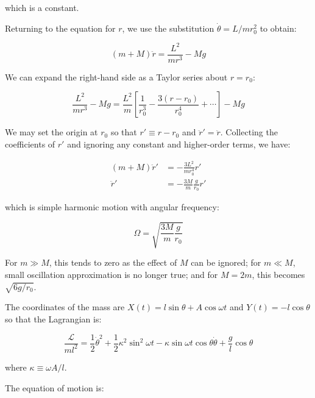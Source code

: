 \documentclass[12pt]{article}
\begin{document}
which is a constant.

Returning to the equation for $r$, we use the substitution $\dot{\theta} = L/mr_{0}^{2}$ to obtain:

\begin{equation}
    (m + M) \ddot{r} = \frac{L^{2}}{mr^{3}} - Mg
\end{equation}

We can expand the right-hand side as a Taylor series about $r = r_{0}$:

\begin{equation}
    \frac{L^{2}}{mr^{3}} - Mg = \frac{L^{2}}{m} \left[ \frac{1}{r_{0}^{3}} - \frac{3(r-r_{0})}{r_{0}^{4}} + \cdots \right] - Mg
\end{equation}

We may set the origin at $r_{0}$ so that $r' \equiv r - r_{0}$ and $\ddot{r}' = \ddot{r}$. Collecting the coefficients of $r'$ and ignoring any constant and higher-order terms, we have:

\begin{equation}
\begin{split}
    (m + M) \ddot{r}' &= -\frac{3L^{2}}{mr_{0}^{4}} r' \\
    \ddot{r}' &= -\frac{3M}{m} \frac{g}{r_{0}} r'
\end{split}
\end{equation}

which is simple harmonic motion with angular frequency:

\begin{equation}
    \Omega = \sqrt{\frac{3M}{m} \frac{g}{r_{0}}}
\end{equation}

For $m \gg M$, this tends to zero as the effect of $M$ can be ignored; for $m \ll M$, small oscillation approximation is no longer true; and for $M = 2m$, this becomes $\sqrt{6g/r_{0}}$.

The coordinates of the mass are $X(t) = l \sin{\theta} + A \cos{\omega t}$ and $Y(t) = -l \cos{\theta}$ so that the Lagrangian is:

\begin{equation}
    \frac{\mathcal{L}}{ml^{2}} = \frac{1}{2} \dot{\theta}^{2} + \frac{1}{2} \kappa^{2} \sin^{2}{\omega t} - \kappa \sin{\omega t} \cos{\theta} \dot{\theta} + \frac{g}{l} \cos{\theta}
\end{equation}

where $\kappa \equiv \omega A/l$.

The equation of motion is:
\end{document}

